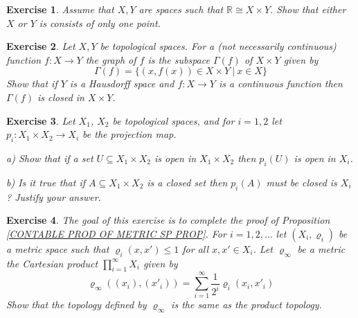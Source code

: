 \documentclass[11pt, letterpaper, oneside]{report}
\theoremstyle{pplain}
\newtheorem{ITERMVALUE THM}[theorem]{Intermediate Value Theorem}
\newtheorem{HEINEBOREL THM}[theorem]{Heine-Borel Theorem}
\newtheorem{UMETR THM}[theorem]{Urysohn Metrization Theorem}
\newtheorem{UMETR2 THM}[theorem]{Urysohn Metrization Theorem (v.2)}
\theoremstyle{ddefinition}
\theoremstyle{nnn}
\newtheorem{TDA NN}[theorem]{Topological Data Analysis. }
\theoremstyle{eexercise}
\newtheorem{exercise}{Exercise}[chapter]
\newcommand{\R}{{\mathbb R}}
\begin{document}
\begin{exercise}
Assume that $X, Y$ are spaces such that  $\R \cong X\times Y$. Show that either $X$ or
$Y$ is consists of only one point.  
\end{exercise}





\begin{exercise}
\label{CLOSED GRAPH EXERCISE}
Let $X, Y$ be topological spaces. For a (not necessarily continuous) function $f\colon X \to Y$ 
the \emph{graph} of $f$ is the subspace 
$\Gamma(f)$ of $X\times Y$ given by 
$$\Gamma(f) = \{ (x, f(x)) \in X\times Y \ | \ x\in X \}$$
Show that if $Y$ is a Hausdorff space and $f\colon X\to Y$ is a continuous function 
then $\Gamma(f)$ is closed in $X\times Y$. 
\end{exercise}





\begin{exercise}
Let $X_{1}$,  $X_{2}$ be topological spaces, and for $i=1, 2$ let $p_{i}\colon X_{1}\times X_{2} \to X_{i}$
be the projection map. 

a) Show that if a set $U \subseteq X_{1}\times X_{2}$ is open in $X_{1}\times X_{2}$
then $p_{i}(U)$ is open in $X_{i}$. 

b) Is it true that  if $A\subseteq X_{1}\times X_{2}$ is a  closed set then  $p_{i}(A)$ must be closed  is 
$X_{i}$ ? Justify your answer.  
\end{exercise}





\begin{exercise}
The goal of this exercise is to complete the proof of Proposition \ref{CONTABLE PROD OF METRIC SP PROP}. 
For $i = 1, 2, \dots$ let $(X_{i}, \varrho_{i})$ be a metric space such that $\varrho_{i}(x, x') \leq 1$ for all 
$x, x'\in X_{i}$. Let $\varrho_{\infty}$ be a metric  the Cartesian product $\prod_{i=1}^{\infty} X_{i}$ given by 
$$\varrho_{\infty}((x_{i}), (x'_{i})) = \sum_{i=1}^{\infty} \frac{1}{2^{i}}\varrho_{i}(x_{i}, x'_{i})$$
Show that the topology defined by $\varrho_{\infty}$ is the same as the product topology.
\end{exercise}
\end{document}

